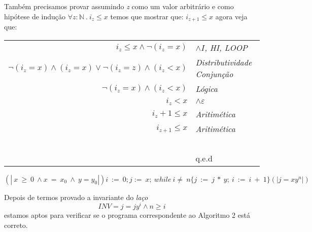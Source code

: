  Também precisamos provar assumindo \emph{z} como um valor arbitrário e como
 hipótese de indução $\forall z : \mathbb{N}\ .\ i_z \leq x$ temos que mostrar
 que: $i_{z+1} \leq x$ agora veja que:
 \begin{center}
     \begin{tabular}{rl}
         \emph{$i_z \leq x \land \neg(i_z = x) $}& \emph{$\land I$, HI, LOOP} \\
         \emph{$\neg(i_z=x) \land (i_z =x) \vee \neg(i_z=z) \land (i_z < x)$}&\emph{Distributividade Conjunção} \\
         \emph{$\neg(i_z =x) \land (i_z < x)$}& \emph{Lógica} \\
         \emph{$i_z < x$}& \emph{$\land \varepsilon$} \\
         \emph{$i_z +1 \leq x$}& \emph{Aritimética} \\
         \emph{$i_{z+1} \leq x$}& \emph{Aritimética} \\
         ~&~\\
         ~&q.e.d\\
     \end{tabular}
 \end{center}
$$(\!|\ x\ \geq\ 0\ \wedge x\ =\ x_0\ \wedge\ y=y_0|\!) i\ :=\ 0; j :=\ x;\
while\ i \neq\ n \{j\ :=\ j\ *\ y;\ i\ :=\ i\ +\ 1\}(\!| j=x y^n |\!) $$

Depois de termos provado a invariante do \emph{laço} \[INV = j = jy^i \land n
\geq i\] estamos aptos para verificar se o programa correspondente ao Algoritmo
2 está correto.

